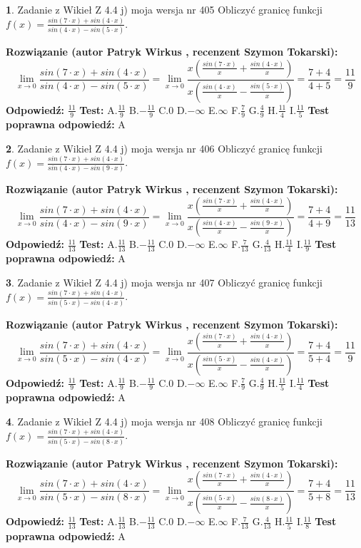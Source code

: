 \documentclass[12pt, a4paper]{article}
\theoremstyle{definition} %
\newtheorem{zad}{}
\newcommand{\zadStart}[1]{\begin{zad}#1\newline}
\newcommand{\zadStop}{\end{zad}}
\newcommand{\rozwStart}[2]{\noindent \textbf{Rozwiązanie (autor #1 , recenzent #2): }\newline}
\newcommand{\rozwStop}{\newline}
\newcommand{\odpStart}{\noindent \textbf{Odpowiedź:}\newline}
\newcommand{\odpStop}{\newline}
\newcommand{\testStart}{\noindent \textbf{Test:}\newline}
\newcommand{\testStop}{\newline}
\newcommand{\kluczStart}{\noindent \textbf{Test poprawna odpowiedź:}\newline}
\newcommand{\kluczStop}{\newline}
\begin{document}
\zadStart{Zadanie z Wikieł Z 4.4 j) moja wersja nr 405}
Obliczyć granicę funkcji $f(x)=\frac{sin(7\cdot x) +sin(4\cdot x)}{sin(4\cdot x) -sin(5\cdot x)}$.
\zadStop
\rozwStart{Patryk Wirkus}{Szymon Tokarski}
$$\lim\limits_{x\to 0}\frac{sin(7\cdot x) +sin(4\cdot x)}{sin(4\cdot x) -sin(5\cdot x)}=\lim\limits_{x\to 0}\frac{x(\frac{sin(7\cdot x)}{x}+\frac{sin(4\cdot x)}{x})}{x(\frac{sin(4\cdot x)}{x}-\frac{sin(5\cdot x)}{x})}=\frac{7+4}{4+5} = \frac{11}{9}$$
\rozwStop
\odpStart
$\frac{11}{9}$
\odpStop
\testStart
A.$\frac{11}{9}$
B.$-\frac{11}{9}$
C.$0$
D.$-\infty$
E.$\infty$
F.$\frac{7}{9}$
G.$\frac{4}{9}$
H.$\frac{11}{4}$
I.$\frac{11}{5}$
\testStop
\kluczStart
A
\kluczStop



\zadStart{Zadanie z Wikieł Z 4.4 j) moja wersja nr 406}
Obliczyć granicę funkcji $f(x)=\frac{sin(7\cdot x) +sin(4\cdot x)}{sin(4\cdot x) -sin(9\cdot x)}$.
\zadStop
\rozwStart{Patryk Wirkus}{Szymon Tokarski}
$$\lim\limits_{x\to 0}\frac{sin(7\cdot x) +sin(4\cdot x)}{sin(4\cdot x) -sin(9\cdot x)}=\lim\limits_{x\to 0}\frac{x(\frac{sin(7\cdot x)}{x}+\frac{sin(4\cdot x)}{x})}{x(\frac{sin(4\cdot x)}{x}-\frac{sin(9\cdot x)}{x})}=\frac{7+4}{4+9} = \frac{11}{13}$$
\rozwStop
\odpStart
$\frac{11}{13}$
\odpStop
\testStart
A.$\frac{11}{13}$
B.$-\frac{11}{13}$
C.$0$
D.$-\infty$
E.$\infty$
F.$\frac{7}{13}$
G.$\frac{4}{13}$
H.$\frac{11}{4}$
I.$\frac{11}{9}$
\testStop
\kluczStart
A
\kluczStop



\zadStart{Zadanie z Wikieł Z 4.4 j) moja wersja nr 407}
Obliczyć granicę funkcji $f(x)=\frac{sin(7\cdot x) +sin(4\cdot x)}{sin(5\cdot x) -sin(4\cdot x)}$.
\zadStop
\rozwStart{Patryk Wirkus}{Szymon Tokarski}
$$\lim\limits_{x\to 0}\frac{sin(7\cdot x) +sin(4\cdot x)}{sin(5\cdot x) -sin(4\cdot x)}=\lim\limits_{x\to 0}\frac{x(\frac{sin(7\cdot x)}{x}+\frac{sin(4\cdot x)}{x})}{x(\frac{sin(5\cdot x)}{x}-\frac{sin(4\cdot x)}{x})}=\frac{7+4}{5+4} = \frac{11}{9}$$
\rozwStop
\odpStart
$\frac{11}{9}$
\odpStop
\testStart
A.$\frac{11}{9}$
B.$-\frac{11}{9}$
C.$0$
D.$-\infty$
E.$\infty$
F.$\frac{7}{9}$
G.$\frac{4}{9}$
H.$\frac{11}{5}$
I.$\frac{11}{4}$
\testStop
\kluczStart
A
\kluczStop



\zadStart{Zadanie z Wikieł Z 4.4 j) moja wersja nr 408}
Obliczyć granicę funkcji $f(x)=\frac{sin(7\cdot x) +sin(4\cdot x)}{sin(5\cdot x) -sin(8\cdot x)}$.
\zadStop
\rozwStart{Patryk Wirkus}{Szymon Tokarski}
$$\lim\limits_{x\to 0}\frac{sin(7\cdot x) +sin(4\cdot x)}{sin(5\cdot x) -sin(8\cdot x)}=\lim\limits_{x\to 0}\frac{x(\frac{sin(7\cdot x)}{x}+\frac{sin(4\cdot x)}{x})}{x(\frac{sin(5\cdot x)}{x}-\frac{sin(8\cdot x)}{x})}=\frac{7+4}{5+8} = \frac{11}{13}$$
\rozwStop
\odpStart
$\frac{11}{13}$
\odpStop
\testStart
A.$\frac{11}{13}$
B.$-\frac{11}{13}$
C.$0$
D.$-\infty$
E.$\infty$
F.$\frac{7}{13}$
G.$\frac{4}{13}$
H.$\frac{11}{5}$
I.$\frac{11}{8}$
\testStop
\kluczStart
A
\kluczStop
\end{document}
